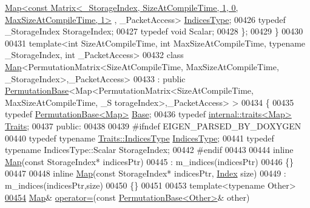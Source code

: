 \begin{DoxyCode}
      \hyperlink{group___core___module_class_eigen_1_1_map}{Map<const Matrix<\_StorageIndex, SizeAtCompileTime, 1, 0, MaxSizeAtCompileTime, 1>}
      , \_PacketAccess> \hyperlink{group___core___module_class_eigen_1_1_matrix}{IndicesType};
00426   \textcolor{keyword}{typedef} \_StorageIndex StorageIndex;
00427   \textcolor{keyword}{typedef} \textcolor{keywordtype}{void} Scalar;
00428 \};
00429 \}
00430 
00431 \textcolor{keyword}{template}<\textcolor{keywordtype}{int} SizeAtCompileTime, \textcolor{keywordtype}{int} MaxSizeAtCompileTime, \textcolor{keyword}{typename} \_StorageIndex, \textcolor{keywordtype}{int} \_PacketAccess>
00432 \textcolor{keyword}{class }\hyperlink{group___core___module_class_eigen_1_1_map}{Map}<PermutationMatrix<SizeAtCompileTime, MaxSizeAtCompileTime, \_StorageIndex>,\_PacketAccess>
00433   : \textcolor{keyword}{public} \hyperlink{group___core___module_class_eigen_1_1_permutation_base}{PermutationBase}<Map<PermutationMatrix<SizeAtCompileTime, MaxSizeAtCompileTime, \_S
      torageIndex>,\_PacketAccess> >
00434 \{
00435     \textcolor{keyword}{typedef} \hyperlink{group___core___module_class_eigen_1_1_permutation_base}{PermutationBase<Map>} \hyperlink{group___core___module_struct_eigen_1_1_eigen_base}{Base};
00436     \textcolor{keyword}{typedef} \hyperlink{struct_eigen_1_1internal_1_1traits}{internal::traits<Map>} \hyperlink{struct_eigen_1_1internal_1_1traits_3_01_permutation_matrix_3_01_size_at_compile_time_00_01_max_sd0808d93099012556270f7c7cd36fcc5}{Traits};
00437   \textcolor{keyword}{public}:
00438 
00439 \textcolor{preprocessor}{    #ifndef EIGEN\_PARSED\_BY\_DOXYGEN}
00440     \textcolor{keyword}{typedef} \textcolor{keyword}{typename} \hyperlink{group___core___module_class_eigen_1_1_matrix}{Traits::IndicesType} \hyperlink{group___core___module_class_eigen_1_1_matrix}{IndicesType};
00441     \textcolor{keyword}{typedef} \textcolor{keyword}{typename} IndicesType::Scalar StorageIndex;
00442 \textcolor{preprocessor}{    #endif}
00443 
00444     \textcolor{keyword}{inline} \hyperlink{group___core___module_class_eigen_1_1_map}{Map}(\textcolor{keyword}{const} StorageIndex* indicesPtr)
00445       : m\_indices(indicesPtr)
00446     \{\}
00447 
00448     \textcolor{keyword}{inline} \hyperlink{group___core___module_class_eigen_1_1_map}{Map}(\textcolor{keyword}{const} StorageIndex* indicesPtr, \hyperlink{group___core___module_a554f30542cc2316add4b1ea0a492ff02}{Index} size)
00449       : m\_indices(indicesPtr,size)
00450     \{\}
00451 
00453     \textcolor{keyword}{template}<\textcolor{keyword}{typename} Other>
\hyperlink{class_eigen_1_1_map_3_01_permutation_matrix_3_01_size_at_compile_time_00_01_max_size_at_compile_2f9d18bf0084dbfb13fbbfe14adaf22d_a15e39faf193bf3d15f75c81096a95e72}{00454}     \hyperlink{group___core___module_class_eigen_1_1_map}{Map}& \hyperlink{class_eigen_1_1_map_3_01_permutation_matrix_3_01_size_at_compile_time_00_01_max_size_at_compile_2f9d18bf0084dbfb13fbbfe14adaf22d_a15e39faf193bf3d15f75c81096a95e72}{operator=}(\textcolor{keyword}{const} \hyperlink{group___core___module_class_eigen_1_1_permutation_base}{PermutationBase<Other>}& other)

\end{DoxyCode}
